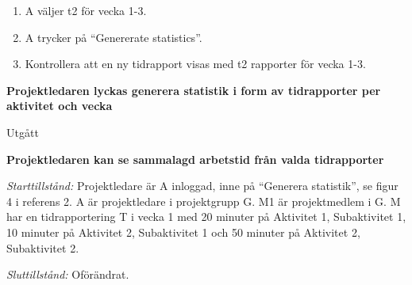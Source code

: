 \documentclass[a4paper]{article}
\begin{document}
\begin{FT}
\begin{enumerate}
\item A väljer t2 för vecka 1-3.
\item A trycker på ``Genererate statistics''.
\item Kontrollera att en ny tidrapport visas med t2 rapporter för vecka 1-3.
\end{enumerate}


\item
\textbf{Projektledaren lyckas generera statistik i form av tidrapporter per aktivitet och vecka}

Utgått





\item
\textbf{Projektledaren kan se sammalagd arbetstid från valda tidrapporter}

\emph{Starttillstånd:} Projektledare är A inloggad, inne på ``Generera statistik'', se figur 4 i referens 2. A är projektledare i projektgrupp G. M1 är projektmedlem i G. M har en tidrapportering T i vecka 1 med 20 minuter på Aktivitet 1, Subaktivitet 1, 10 minuter på Aktivitet 2, Subaktivitet 1 och 50 minuter på Aktivitet 2, Subaktivitet 2.

\emph{Sluttillstånd:} Oförändrat.


\end{FT}
\end{document}
